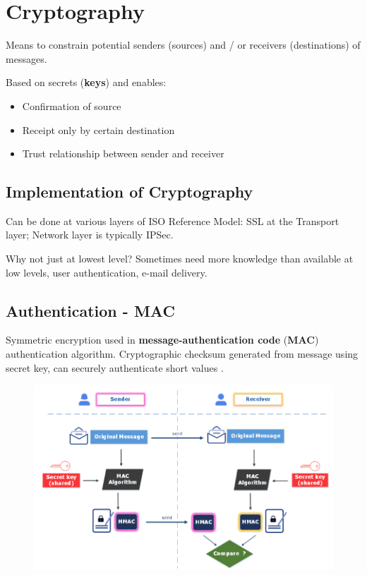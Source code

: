 \section{Cryptography}

Means to constrain potential senders (sources) and / or receivers (destinations) of messages.

Based on secrets (\textbf{keys}) and enables:

\begin{itemize}
    \item Confirmation of source
    \item Receipt only by certain destination
    \item Trust relationship between sender and receiver
\end{itemize}

\subsection{Implementation of Cryptography}


Can be done at various layers of ISO Reference
Model: SSL at the Transport layer; Network layer is typically IPSec.


Why not just at lowest level?
Sometimes need more knowledge than available at
low levels, user authentication, e-mail delivery.

\subsection{Authentication - MAC }

Symmetric encryption used in \textbf{message-authentication code} (\textbf{MAC}) authentication algorithm. Cryptographic checksum generated from message using secret key, can securely authenticate short values .


\begin{figure}[h!]
    \centering
    \includegraphics[width=0.55\linewidth]{img/dfsbvfbsdb.png}
\end{figure}


